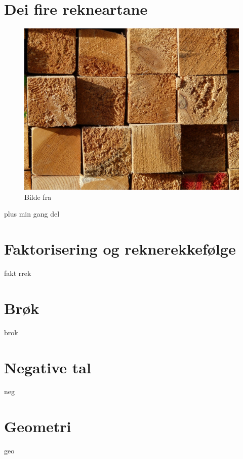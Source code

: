 \chapter{Dei fire rekneartane \label{Rekneartane}}
\begin{figure}
	\centering
	\includegraphics[scale=0.38]{wood} \\
{\footnotesize Bilde fra } 
\end{figure}
\newpage
{plus}
{min}
{gang}
{del}

\chapter{Faktorisering og reknerekkefølge}
\newpage
{fakt}
{rrek}

\chapter{Brøk}
\newpage
{brok}

\chapter{Negative tal \label{Negtal}}
\newpage
{neg}


\chapter{Geometri}
\newpage
{geo}


